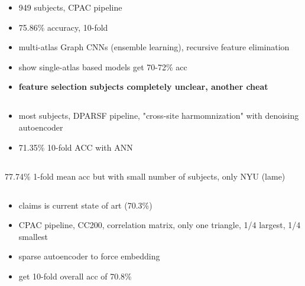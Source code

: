 \documentclass[10pt]{article}
\begin{document}
\begin{itemize}
  \item 949 subjects, CPAC pipeline
  \item 75.86\% accuracy, 10-fold
  \item multi-atlas Graph CNNs (ensemble learning), recursive feature elimination
  \item show single-atlas based models get 70-72\% acc
  \item \textbf{feature selection subjects completely unclear, another cheat}
\end{itemize}

\subsection{\citet{ingalhalikarFunctionalConnectivitybasedPrediction2021}}

\begin{itemize}
  \item most subjects, DPARSF pipeline, "cross-site harmomnization" with denoising autoencoder
  \item 71.35\% 10-fold ACC with ANN
\end{itemize}

\subsection{\citet{yangLargeScaleBrainFunctional2021}}

77.74\% 1-fold mean acc but with small number of subjects, only NYU (lame)

\subsection{\citet{almuqhimASDSAENetSparseAutoencoder2021}}

\begin{itemize}
  \item claims \citet{eslamiASDDiagNetHybridLearning2019} is current state of art (70.3\%)
  \item CPAC pipeline, CC200, correlation matrix, only one triangle, 1/4 largest, 1/4 smallest
  \item sparse autoencoder to force embedding
  \item get 10-fold overall acc of 70.8\%
\end{itemize}

\subsection{\citet{byeonArtificialNeuralNetwork2020}}
\end{document}
